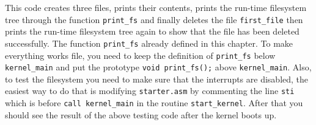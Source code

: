 This code creates three files, prints their contents, prints the
run-time filesystem tree through the function \lstinline!print_fs! and
finally deletes the file \lstinline!first_file! then prints the run-time
filesystem tree again to show that the file has been deleted
successfully. The function \lstinline!print_fs! already defined in this
chapter. To make everything works file, you need to keep the definition
of \lstinline!print_fs! below \lstinline!kernel_main! and put the
prototype \lstinline!void print_fs();! above \lstinline!kernel_main!.
Also, to test the filesystem you need to make sure that the interrupts
are disabled, the easiest way to do that is modifying
\lstinline!starter.asm! by commenting the line \lstinline!sti! which is
before \lstinline!call kernel_main! in the routine
\lstinline!start_kernel!. After that you should see the result of the
above testing code after the kernel boots up.
